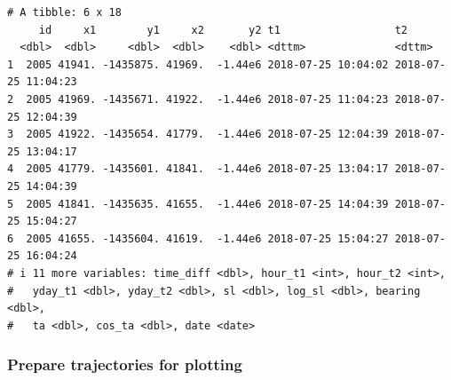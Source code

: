 \documentclass[
  letterpaper,
  DIV=11,
  numbers=noendperiod]{scrartcl}
\begin{document}
\begin{verbatim}
# A tibble: 6 x 18
     id     x1        y1     x2       y2 t1                  t2                 
  <dbl>  <dbl>     <dbl>  <dbl>    <dbl> <dttm>              <dttm>             
1  2005 41941. -1435875. 41969.  -1.44e6 2018-07-25 10:04:02 2018-07-25 11:04:23
2  2005 41969. -1435671. 41922.  -1.44e6 2018-07-25 11:04:23 2018-07-25 12:04:39
3  2005 41922. -1435654. 41779.  -1.44e6 2018-07-25 12:04:39 2018-07-25 13:04:17
4  2005 41779. -1435601. 41841.  -1.44e6 2018-07-25 13:04:17 2018-07-25 14:04:39
5  2005 41841. -1435635. 41655.  -1.44e6 2018-07-25 14:04:39 2018-07-25 15:04:27
6  2005 41655. -1435604. 41619.  -1.44e6 2018-07-25 15:04:27 2018-07-25 16:04:24
# i 11 more variables: time_diff <dbl>, hour_t1 <int>, hour_t2 <int>,
#   yday_t1 <dbl>, yday_t2 <dbl>, sl <dbl>, log_sl <dbl>, bearing <dbl>,
#   ta <dbl>, cos_ta <dbl>, date <date>
\end{verbatim}

\subsubsection{Prepare trajectories for
plotting}\label{prepare-trajectories-for-plotting}
\end{document}
